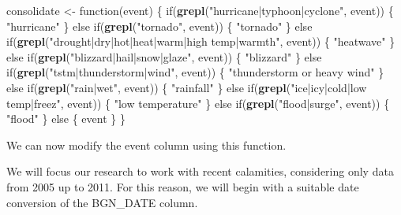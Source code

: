 \documentclass[]{article}
\newenvironment{Shaded}{\begin{snugshade}}{\end{snugshade}}
\newcommand{\KeywordTok}[1]{\textcolor[rgb]{0.13,0.29,0.53}{\textbf{{#1}}}}
\newcommand{\DataTypeTok}[1]{\textcolor[rgb]{0.13,0.29,0.53}{{#1}}}
\newcommand{\StringTok}[1]{\textcolor[rgb]{0.31,0.60,0.02}{{#1}}}
\newcommand{\NormalTok}[1]{{#1}}
\begin{document}
\begin{Shaded}
\begin{Highlighting}[]
\NormalTok{consolidate <-}\StringTok{ }\NormalTok{function(event)}
\NormalTok{\{}
  \NormalTok{if(}\KeywordTok{grepl}\NormalTok{(}\StringTok{"hurricane|typhoon|cyclone"}\NormalTok{, event))}
  \NormalTok{\{ }\StringTok{"hurricane"} \NormalTok{\}}
  \NormalTok{else if(}\KeywordTok{grepl}\NormalTok{(}\StringTok{"tornado"}\NormalTok{, event))}
    \NormalTok{\{ }\StringTok{"tornado"} \NormalTok{\}}
  \NormalTok{else if(}\KeywordTok{grepl}\NormalTok{(}\StringTok{"drought|dry|hot|heat|warm|high temp|warmth"}\NormalTok{, event))}
    \NormalTok{\{ }\StringTok{"heatwave"} \NormalTok{\}}
  \NormalTok{else if(}\KeywordTok{grepl}\NormalTok{(}\StringTok{"blizzard|hail|snow|glaze"}\NormalTok{, event))}
    \NormalTok{\{ }\StringTok{"blizzard"} \NormalTok{\}}
  \NormalTok{else if(}\KeywordTok{grepl}\NormalTok{(}\StringTok{"tstm|thunderstorm|wind"}\NormalTok{, event))}
    \NormalTok{\{ }\StringTok{"thunderstorm or heavy wind"} \NormalTok{\}}
  \NormalTok{else if(}\KeywordTok{grepl}\NormalTok{(}\StringTok{"rain|wet"}\NormalTok{, event))}
    \NormalTok{\{ }\StringTok{"rainfall"} \NormalTok{\}}
  \NormalTok{else if(}\KeywordTok{grepl}\NormalTok{(}\StringTok{"ice|icy|cold|low temp|freez"}\NormalTok{, event))}
  \NormalTok{\{ }\StringTok{"low temperature"} \NormalTok{\}}
  \NormalTok{else if(}\KeywordTok{grepl}\NormalTok{(}\StringTok{"flood|surge"}\NormalTok{, event))}
    \NormalTok{\{ }\StringTok{"flood"} \NormalTok{\}}
  \NormalTok{else \{ event \}}
\NormalTok{\}}
\end{Highlighting}
\end{Shaded}

We can now modify the event column using this function.

\begin{Shaded}
\end{Shaded}

We will focus our research to work with recent calamities, considering
only data from 2005 up to 2011. For this reason, we will begin with a
suitable date conversion of the BGN\_DATE column.

\begin{Shaded}
\end{Shaded}
\end{document}
